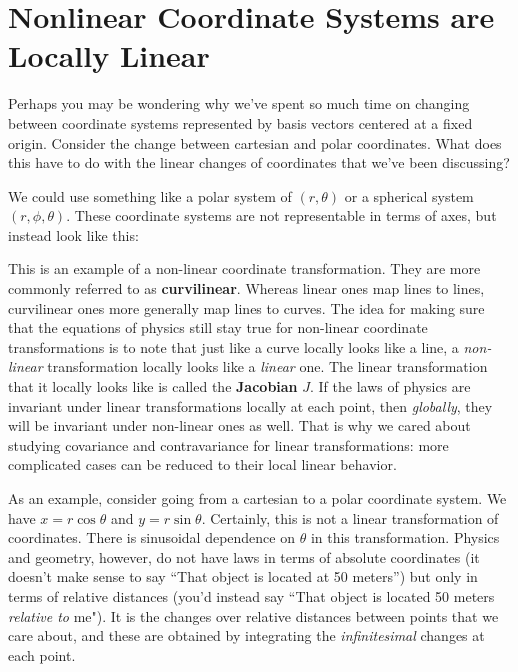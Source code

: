 \documentclass[../master.tex]{subfiles}
\begin{document}

	\section[Nonlinear Coordinate Systems are Locally Linear]{Nonlinear Coordinate Systems are\\ Locally Linear}%
	\label{sec:nonlinear_coordinate_systems_are_locally_linear}
	
	Perhaps you may be wondering why we've spent so much time on changing between coordinate systems represented by basis vectors centered at a fixed origin. Consider the change between cartesian and polar coordinates. What does this have to do with the linear changes of coordinates that we've been discussing?
	
	We could use something like a polar system of $(r,\theta)$ or a spherical system $(r, \phi, \theta)$. These coordinate systems are not representable in terms of axes, but instead look like this:
	
	
	This is an example of a non-linear coordinate transformation. They are more commonly referred to as \textbf{curvilinear}. Whereas linear ones map lines to lines, curvilinear ones more generally map lines to curves. The idea for making sure that the equations of physics still stay true for non-linear coordinate transformations is to note that just like a curve locally looks like a line, a \emph{non-linear} transformation locally looks like a \emph{linear} one. The linear transformation that it locally looks like is called the \textbf{Jacobian}  $J$. If the laws of physics are invariant under linear transformations locally at each point, then \emph{globally}, they will be invariant under non-linear ones as well. That is why we cared about studying covariance and contravariance for linear transformations: more complicated cases can be reduced to their local linear behavior.
	
	As an example, consider going from a cartesian to a polar coordinate system. We have $x = r \cos \theta$ and $y = r \sin \theta$. Certainly, this is not a linear transformation of coordinates. There is sinusoidal dependence on $\theta$ in this transformation. Physics and geometry, however, do not have laws in terms of absolute coordinates (it doesn't make sense to say ``That object is located at 50 meters'') but only in terms of relative distances (you'd instead say ``That object is located 50 meters \emph{relative to} me"). It is the changes over relative distances between points that we care about, and these are obtained by integrating the \emph{infinitesimal} changes at each point. 
	
\end{document}
